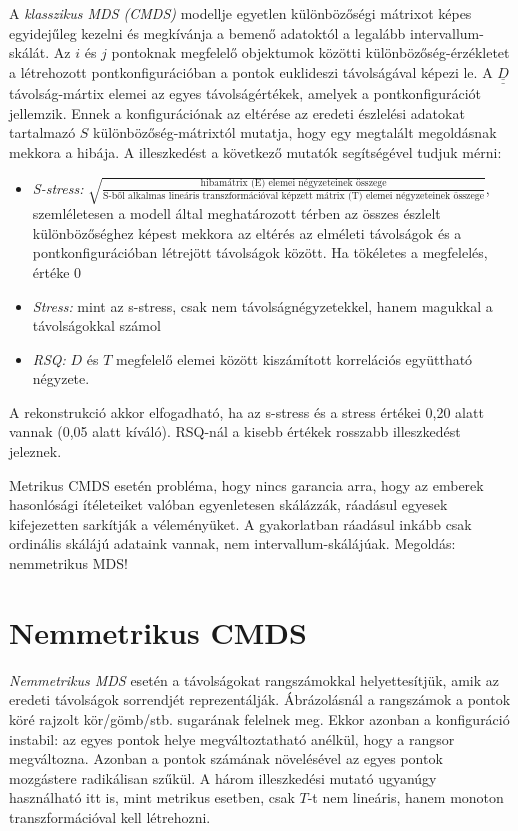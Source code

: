 A \emph{klasszikus MDS (CMDS)} modellje egyetlen különbözőségi mátrixot képes egyidejűleg kezelni és megkívánja a bemenő adatoktól a legalább intervallum-skálát. Az $i$ és $j$ pontoknak megfelelő objektumok közötti különbözőség-érzékletet a létrehozott pontkonfigurációban a pontok euklideszi távolságával képezi le. A $\underline{\underline{D}}$ távolság-mártix elemei az egyes távolságértékek, amelyek a pontkonfigurációt jellemzik. Ennek a konfigurációnak az eltérése az eredeti észlelési adatokat tartalmazó $S$ különbözőség-mátrixtól mutatja, hogy egy megtalált megoldásnak mekkora a hibája. A illeszkedést a következő mutatók segítségével tudjuk mérni:
\begin{itemize}
\item \emph{S-stress:} $\sqrt{\frac{\text{hibamátrix (E) elemei négyzeteinek összege}}{\text{S-ből alkalmas lineáris transzformációval képzett mátrix (T) elemei négyzeteinek összege}}}$,\\szemléletesen a modell által meghatározott térben az összes észlelt különbözőséghez képest mekkora az eltérés az elméleti távolságok és a pontkonfigurációban létrejött távolságok között. Ha tökéletes a megfelelés, értéke 0
\item \emph{Stress:} mint az s-stress, csak nem távolságnégyzetekkel, hanem magukkal a távolságokkal számol
\item \emph{RSQ:} $D$ és $T$ megfelelő elemei között kiszámított korrelációs együttható négyzete.
\end{itemize}
A rekonstrukció akkor elfogadható, ha az s-stress és a stress értékei 0,20 alatt vannak (0,05 alatt kíváló). RSQ-nál a kisebb értékek rosszabb illeszkedést jeleznek.

Metrikus CMDS esetén probléma, hogy nincs garancia arra, hogy az emberek hasonlósági ítéleteiket valóban egyenletesen skálázzák, ráadásul egyesek kifejezetten sarkítják a véleményüket. A gyakorlatban ráadásul inkább csak ordinális skálájú adataink vannak, nem intervallum-skálájúak. Megoldás: nemmetrikus MDS!

\section{Nemmetrikus CMDS}

\emph{Nemmetrikus MDS} esetén a távolságokat rangszámokkal helyettesítjük, amik az eredeti távolságok sorrendjét reprezentálják. Ábrázolásnál a rangszámok a pontok köré rajzolt kör/gömb/stb. sugarának felelnek meg. Ekkor azonban a konfiguráció instabil: az egyes pontok helye megváltoztatható anélkül, hogy a rangsor megváltozna. Azonban a pontok számának növelésével az egyes pontok mozgástere radikálisan szűkül. A három illeszkedési mutató ugyanúgy használható itt is, mint metrikus esetben, csak $T$-t nem lineáris, hanem monoton transzformációval kell létrehozni.

